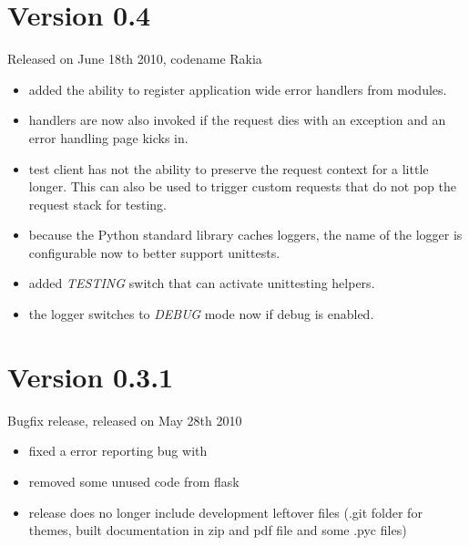 \documentclass[a4paper,12pt]{sphinxmanual}
\begin{document}
\section{Version 0.4}
\label{changelog:version-0-4}
Released on June 18th 2010, codename Rakia
\begin{itemize}
\item {} 
added the ability to register application wide error handlers
from modules.

\item {} 
{\hyperref[api:flask.Flask.after_request]{}} handlers are now also invoked
if the request dies with an exception and an error handling page
kicks in.

\item {} 
test client has not the ability to preserve the request context
for a little longer.  This can also be used to trigger custom
requests that do not pop the request stack for testing.

\item {} 
because the Python standard library caches loggers, the name of
the logger is configurable now to better support unittests.

\item {} 
added \emph{TESTING} switch that can activate unittesting helpers.

\item {} 
the logger switches to \emph{DEBUG} mode now if debug is enabled.

\end{itemize}


\section{Version 0.3.1}
\label{changelog:version-0-3-1}
Bugfix release, released on May 28th 2010
\begin{itemize}
\item {} 
fixed a error reporting bug with {\hyperref[api:flask.Config.from_envvar]{}}

\item {} 
removed some unused code from flask

\item {} 
release does no longer include development leftover files (.git
folder for themes, built documentation in zip and pdf file and
some .pyc files)

\end{itemize}
\end{document}
